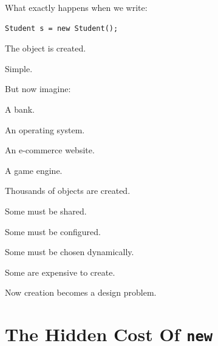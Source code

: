 \documentclass[11pt,a4paper]{book}
\begin{document}
What exactly happens when we write:

\begin{verbatim}
Student s = new Student();
\end{verbatim}


The object is created.


Simple.


But now imagine:


A bank.


An operating system.


An e-commerce website.


A game engine.


Thousands of objects are created.


Some must be shared.


Some must be configured.


Some must be chosen dynamically.


Some are expensive to create.


Now creation becomes a design problem.


\section{The Hidden Cost Of \texttt{new}}
\end{document}

